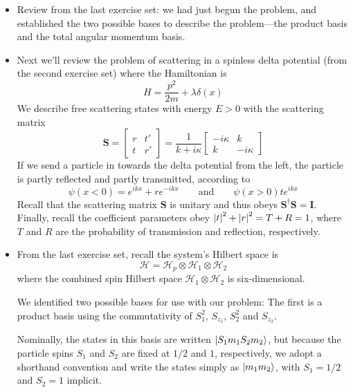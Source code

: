 \documentclass[11pt, a4paper]{article}
\newcommand{\eqtext}[1]{\qquad \text{#1} \qquad}
\newcommand{\mat}[1]{\mathbf{#1}} %
\renewcommand{\H}{\mathcal{H}}  %
\begin{document}
\begin{itemize}
	\item Review from the last exercise set: we had just begun the problem, and established the two possible bases to describe the problem---the product basis and the total angular momentum basis.
	
	\item Next we'll review the problem of scattering in a spinless delta potential (from the second exercise set) where the Hamiltonian is
	\begin{equation*}
		H = \frac{p^{2}}{2m} + \lambda \delta (x)
	\end{equation*}
	We describe free scattering states with energy $ E > 0 $ with the scattering matrix
	\begin{equation*}
		\mat{S} = 
		\begin{bmatrix}
			r & t'\\
			t & r'
		\end{bmatrix}
		 = 
		 \frac{1}{k + i \kappa}
		 \begin{bmatrix}
		 	- i\kappa & k\\
		 	k	& - i\kappa
		 \end{bmatrix}
	\end{equation*}
	If we send a particle in towards the delta potential from the left, the particle is partly reflected and partly transmitted, according to
	\begin{equation*}
		\psi(x < 0) = e^{ikx} + re^{-ikx} \eqtext{and} \psi(x>0) te^{ikx}
	\end{equation*}
	Recall that the scattering matrix $ \mat{S} $ is unitary and thus obeys $ \mat{S}^{\dagger}\mat{S} = \mat{I} $. Finally, recall the coefficient parameters obey $ \abs{t}^{2} + \abs{r}^{2} = T + R = 1 $, where $ T $ and $ R $ are the probability of transmission and reflection, respectively.
	
	\item From the last exercise set, recall the system's Hilbert space is
	\begin{equation*}
		\H = \H_{p} \otimes \H_{1} \otimes \H_{2}
	\end{equation*}
	where the combined spin Hilbert space $ \H_{1} \otimes \H_{2} $ is six-dimensional.
	
	We identified two possible bases for use with our problem: The first is a product basis using the commutativity of $ S_{1}^{2} $, $ S_{z_{1}} $, $ S_{2}^{2} $ and $ S_{z_{2}} $. 
	
	Nominally, the states in this basis are written $ \ket{S_{1}m_{1}S_{2}m_{2}} $, but because the particle spins $ S_{1} $ and $ S_{2} $ are fixed at $ 1/2 $ and $ 1 $, respectively, we adopt a shorthand convention and write the states simply as $ \ket{m_{1}m_{2}} $, with $ S_{1} = 1/2 $ and $ S_{2} = 1 $ implicit.
	

\end{itemize}
\end{document}

